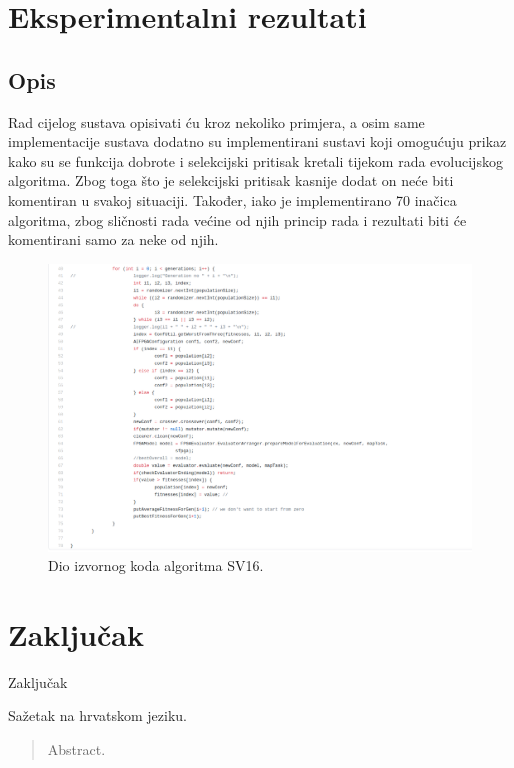 \documentclass[times, utf8, zavrsni]{fer}
\begin{document}
\chapter{Eksperimentalni rezultati}

\section{Opis}

Rad cijelog sustava opisivati ću kroz nekoliko primjera, a osim same implementacije sustava dodatno su implementirani sustavi koji omogućuju prikaz kako su se funkcija dobrote i selekcijski pritisak kretali tijekom rada evolucijskog algoritma. Zbog toga što je selekcijski pritisak kasnije dodat on neće biti komentiran u svakoj situaciji. Također, iako je implementirano 70 inačica algoritma, zbog sličnosti rada većine od njih princip rada i rezultati biti će komentirani samo za neke od njih. 

\begin{figure}[!htb]
	\centering
	\includegraphics[width=18cm]{slike/srcAlg.png}
	\caption{Dio izvornog koda algoritma SV16.}
	\label{fig:sv16-src}
\end{figure} 



\chapter{Zaključak}
Zaključak




\begin{sazetak}
Sažetak na hrvatskom jeziku.

\end{sazetak}

\begin{abstract}
Abstract.

\end{abstract}
\end{document}
